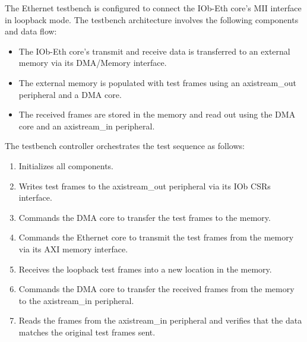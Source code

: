 %

The Ethernet testbench is configured to connect the IOb-Eth core's MII interface in loopback mode. The testbench architecture involves the following components and data flow:

\begin{itemize}
  \item The IOb-Eth core's transmit and receive data is transferred to an external memory via its DMA/Memory interface.
  \item The external memory is populated with test frames using an axistream\_out peripheral and a DMA core.
  \item The received frames are stored in the memory and read out using the DMA core and an axistream\_in peripheral.
\end{itemize}

The testbench controller orchestrates the test sequence as follows:

\begin{enumerate}
  \item Initializes all components.
  \item Writes test frames to the axistream\_out peripheral via its IOb CSRs interface.
  \item Commands the DMA core to transfer the test frames to the memory.
  \item Commands the Ethernet core to transmit the test frames from the memory via its AXI memory interface.
  \item Receives the loopback test frames into a new location in the memory.
  \item Commands the DMA core to transfer the received frames from the memory to the axistream\_in peripheral.
  \item Reads the frames from the axistream\_in peripheral and verifies that the data matches the original test frames sent.
\end{enumerate}

\FloatBarrier

